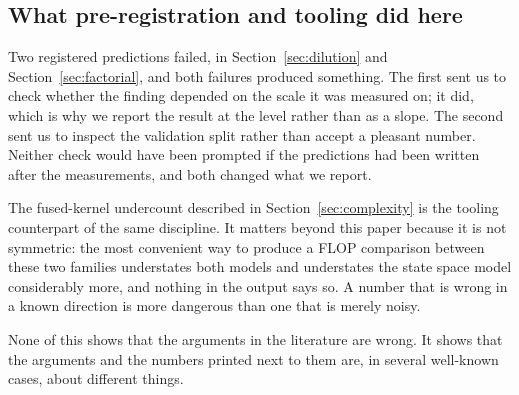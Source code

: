 \subsection{What pre-registration and tooling did here}

Two registered predictions failed, in Section~\ref{sec:dilution} and
Section~\ref{sec:factorial}, and both failures produced something. The first
sent us to check whether the finding depended on the scale it was measured
on; it did, which is why we report the result at the level rather than as a
slope. The second sent us to inspect the validation split rather than accept
a pleasant number. Neither check would have been prompted if the predictions
had been written after the measurements, and both changed what we report.

The fused-kernel undercount described in Section~\ref{sec:complexity} is the
tooling counterpart of the same discipline. It matters beyond this paper
because it is not symmetric: the most convenient way to produce a FLOP
comparison between these two families understates both models and understates
the state space model considerably more, and nothing in the output says so.
A number that is wrong in a known direction is more dangerous than one that
is merely noisy.

None of this shows that the arguments in the literature are wrong. It shows
that the arguments and the numbers printed next to them are, in several
well-known cases, about different things.
